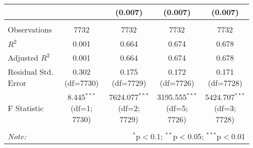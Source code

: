 \documentclass{article}
\begin{document}
\begin{landscape}
\begin{table}[!htbp]
\begin{tabular}{@{\extracolsep{5pt}}lcccc}
    & & (0.007) & (0.007) & (0.007) \\
    \hline \\[-1.8ex]
     Observations & 7732 & 7732 & 7732 & 7732 \\
     $R^2$ & 0.001 & 0.664 & 0.674 & 0.678 \\
     Adjusted $R^2$ & 0.001 & 0.664 & 0.674 & 0.678 \\
     Residual Std. Error & 0.302 (df=7730) & 0.175 (df=7729) & 0.172 (df=7726) & 0.171 (df=7728) \\
     F Statistic & 8.445$^{***}$ (df=1; 7730) & 7624.077$^{***}$ (df=2; 7729) & 3195.555$^{***}$ (df=5; 7726) & 5424.707$^{***}$ (df=3; 7728) \\
    \hline
    \hline \\[-1.8ex]
    \textit{Note:} & \multicolumn{4}{r}{$^{*}$p$<$0.1; $^{**}$p$<$0.05; $^{***}$p$<$0.01} \\
    \end{tabular}
    \end{table}
\end{landscape}
\end{document}
